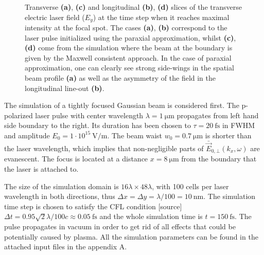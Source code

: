 \begin{figure}[h!]
	\hspace{2mm}
	\caption{Transverse \textbf{(a)}, \textbf{(c)} and longitudinal \textbf{(b)}, \textbf{(d)} slices of the transverse electric laser field ($ E_{y} $) at the time step when it reaches maximal intensity at the focal spot. The cases \textbf{(a)}, \textbf{(b)} correspond to the laser pulse initialized using the paraxial approximation, whilst \textbf{(c)}, \textbf{(d)} come from the simulation where the beam at the boundary is given by the Maxwell consistent approach. In the case of paraxial approximation, one can clearly see strong side-wings in the spatial beam profile \textbf{(a)} as well as the asymmetry of the field in the longitudinal line-out \textbf{(b)}.}
	\label{fig:2}
\end{figure}

The simulation of a tightly focused Gaussian beam is considered first. The p-polarized laser pulse with center wavelength $ \lambda = 1 \: \mathrm{\mu m} $ propagates from left hand side boundary to the right. Its duration has been chosen to $ \tau = 20 \: \mathrm{fs} $ in FWHM and amplitude $ E_0 = 1 \cdot 10^{15} \: \mathrm{V/m} $. The beam waist $ w_0 = 0.7 \: \mathrm{\mu m} $ is shorter than the laser wavelength, which implies that non-negligible parts of $ \bar{\vec{E}}_{0, \bot}(k_x, \omega) $ are evanescent. The focus is located at a distance $ x = 8 \: \mathrm{\mu m} $ from the boundary that the laser is attached to.

The size of the simulation domain is $ 16 \lambda \times 48 \lambda $, with 100 cells per laser wavelength in both directions, thus $ \Delta x = \Delta y = \lambda/100 = 10 \: \mathrm{nm} $. The simulation time step is chosen to satisfy the CFL condition [source] $ \Delta t = 0.95 \sqrt{2} \lambda/ 100 c \approx 0.05 \: \mathrm{fs} $ and the whole simulation time is $ t = 150 \: \mathrm{fs} $. The pulse propagates in vacuum in order to get rid of all effects that could be potentially caused by plasma. All the simulation parameters can be found in the attached input files in the appendix A.

